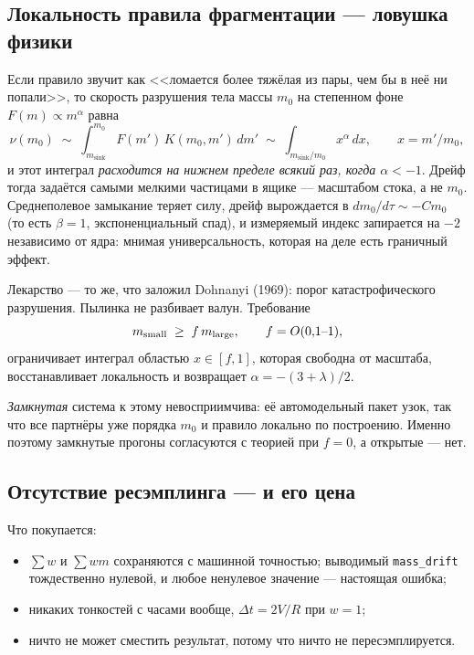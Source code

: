 \documentclass[a4paper,12pt]{article}
\newcommand{\msink}{m_{\mathrm{sink}}}
\newcommand{\code}[1]{\texttt{#1}}
\begin{document}
\subsection{Локальность правила фрагментации --- ловушка физики}
\label{sec:trick8}

Если правило звучит как <<ломается более тяжёлая из пары, чем бы в неё ни
попали>>, то скорость разрушения тела массы $m_0$ на степенном фоне
$F(m) \propto m^{\alpha}$ равна
\begin{equation}
  \nu(m_0) \;\sim\; \int_{\msink}^{m_0} F(m')\,K(m_0,m')\,dm'
           \;\sim\; \int_{\msink/m_0} x^{\alpha}\,dx ,
  \qquad x = m'/m_0 ,
\end{equation}
и этот интеграл \emph{расходится на нижнем пределе всякий раз, когда
$\alpha < -1$}. Дрейф тогда задаётся самыми мелкими частицами в ящике ---
масштабом стока, а не $m_0$. Среднеполевое замыкание теряет силу, дрейф
вырождается в $dm_0/d\tau \sim -C m_0$ (то есть $\beta = 1$,
экспоненциальный спад), и измеряемый индекс запирается на $-2$ независимо
от ядра: мнимая универсальность, которая на деле есть граничный эффект.

Лекарство --- то же, что заложил Dohnanyi (1969): порог катастрофического
разрушения. Пылинка не разбивает валун. Требование
\begin{equation}
  m_{\rm small} \;\ge\; f\,m_{\rm large},
  \qquad f = O(0{,}1\text{--}1),
\end{equation}
ограничивает интеграл областью $x \in [f,1]$, которая свободна от масштаба,
восстанавливает локальность и возвращает $\alpha = -(3+\lambda)/2$.

\emph{Замкнутая} система к этому невосприимчива: её автомодельный пакет
узок, так что все партнёры уже порядка $m_0$ и правило локально по
построению. Именно поэтому замкнутые прогоны согласуются с теорией при
$f=0$, а открытые --- нет.

\subsection{Отсутствие ресэмплинга --- и его цена}
\label{sec:num_cost}

Что покупается:
\begin{itemize}
  \item $\sum w$ и $\sum wm$ сохраняются с машинной точностью; выводимый
        \code{mass\_drift} тождественно нулевой, и любое ненулевое значение ---
        настоящая ошибка;
  \item никаких тонкостей с часами вообще, $\Delta t = 2V/R$ при $w=1$;
  \item ничто не может сместить результат, потому что ничто не
        пересэмплируется.
\end{itemize}
\end{document}
